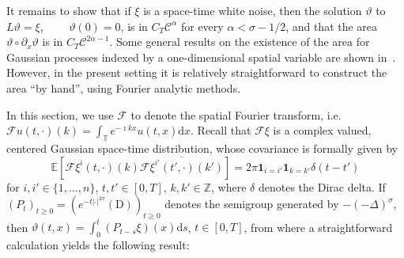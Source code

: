 \documentclass[11pt,a4paper]{article}
\newcommand{\mathD}{\mathrm{D}}
\newcommand{\mathd}{\mathrm{d}}
\theoremstyle{remark}
\newcommand{\Z}{\mathbb{Z}}
\newcommand{\E}{\mathbb{E}}
\newcommand{\CC}{\ensuremath{\mathscr{C}}}
\newcommand{\CF}{\ensuremath{\mathscr{F}}}
\begin{document}
It remains to show that if $\xi$ is a space-time white noise, then the solution $\vartheta$ to $L \vartheta = \xi$, $\qquad \vartheta(0) = 0$, is in $C_T\CC^\alpha$ for every $\alpha < \sigma - 1/2$, and that the area $\vartheta \circ \partial_x \vartheta$ is in $C_T \CC^{2 \alpha - 1}$. Some general results on the existence of the area for Gaussian processes indexed by a one-dimensional spatial variable are shown in~\cite{Friz2012}. However, in the present setting it is relatively straightforward to construct the area ``by hand'', using Fourier analytic methods.
%

In this section, we use $\CF$ to denote the spatial Fourier transform, i.e. $\CF u(t,\cdot) (k) = \int_\mathbb{T} e^{-\imath k x} u(t,x) \mathd x$. Recall that $\CF \xi$ is a complex valued, centered Gaussian space-time distribution, whose covariance is formally given by
\[
   \E[\CF \xi^i (t,\cdot)(k) \overline{\CF \xi^{i'} (t',\cdot)(k')}] = 2\pi \mathbf{1}_{i=i'} \mathbf{1}_{k=k'} \delta(t - t')
\]
for $i,i'\in \{1, \dots, n\}$, $t, t' \in [0,T]$, $k, k' \in \Z$, where $\delta$ denotes the Dirac delta. If $(P_t)_{t\ge 0} = (e^{-t |\cdot|^{2\sigma}}(\mathD))_{t \ge 0}$ denotes the semigroup generated by $-(-\Delta)^\sigma$, then $\vartheta(t,x) = \int_{0}^t (P_{t-s} \xi)(x)\mathd s$, $t \in [0,T]$, from where a straightforward calculation yields the following result:
\end{document}
